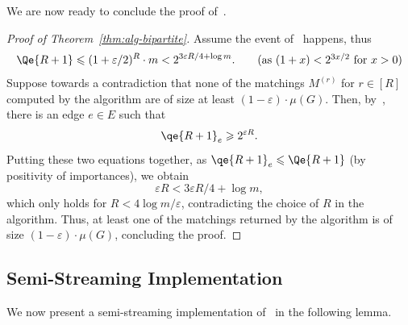 \documentclass{article}
\renewcommand{\leq}{\leqslant}
\renewcommand{\geq}{\geqslant}
\newcommand{\eps}{\varepsilon}
\begin{document}
We are now ready to conclude the proof of~. 

\begin{proof}[Proof of Theorem~\ref{thm:alg-bipartite}]
	Assume the event of~ happens, thus
	\begin{align*}
		\Qe{R+1} \leq (1+\eps/2)^{R} \cdot m < 2^{3\eps R/4 + \log{m}}. \tag{as $(1+x) < 2^{3x/2}$ for $x > 0$} 
	\end{align*}
	Suppose towards a contradiction that none of the matchings $M^{(r)}$ for $r \in [R]$ computed by the algorithm
	are of size at least $(1-\eps) \cdot \mu(G)$. Then, by~, there is an edge $e \in E$ such that 
	\[
		\qe{R+1}_e \geq 2^{\eps R}. 
	\]
	Putting these two equations together, as $\qe{R+1}_e \leq \Qe{R+1}$ (by positivity of importances), we obtain 
	\[
		\eps R < 3\eps R/4 + \log{m}, 
	\]
	which only holds for $R < 4\log{m}/\eps$, contradicting the choice of $R$ in the algorithm. Thus, at least one of the matchings returned by the algorithm is of size $(1-\eps) \cdot \mu(G)$, 
	concluding the proof. 
\end{proof}


\subsection*{Semi-Streaming Implementation}%

We now present a semi-streaming implementation of~ in the following lemma. 
\end{document}
